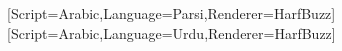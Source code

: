 %

\newcommand{\FrankLangName}{persian}
\FrankRTLtrue            %
\FrankHasBaretrue        %
\FrankHasAlttrue         %
\FrankHasReadingfalse    %
\FrankHasVertfalse

[Script=Arabic,Language=Parsi,Renderer=HarfBuzz]{\FrankMainFontName}
\newfontfamily\nastaliqfont{\FrankAltFontName}%
  [Script=Arabic,Language=Urdu,Renderer=HarfBuzz]
\newcommand{\FrankAltFont}{\nastaliqfont}


